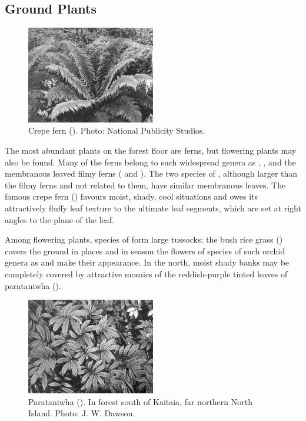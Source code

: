 \subsection{Ground Plants}

\begin{figure}
	\includegraphics[width=0.5\textwidth]{graphics/figure62crepefern.jpg}
	\centering
	\caption[Crepe fern (\emph{Leptopteris superb a}]{Crepe fern ().
	Photo: National Publicity Studios.}
	\label{fig:62crepefern}
\end{figure}

The most abundant plants on the forest floor are ferns, but flowering plants may also be found.
Many of the ferns belong to such widespread genera as , ,  and the membranous leaved filmy ferns ( and ).
The two species of , although larger than the filmy ferns and not related to them, have similar membranous leaves.
The famous crepe fern () favours moist, shady, cool situations and owes its attractively fluffy leaf texture to the ultimate leaf segments, which are set at right angles to the plane of the leaf.

Among flowering plants, species of  form large tussocks; the bush rice grass () covers the ground in places and in season the flowers of species of such orchid genera as  and  make their appearance.
In the north, moist shady banks may be completely covered by attractive mosaics of the reddish-purple tinted leaves of parataniwha ().

\begin{figure}
	\includegraphics[width=0.5\textwidth]{graphics/figure63parataniwha.jpg}
	\centering
	\caption[Parataniwha]{Parataniwha ().
In forest south of Kaitaia, far northern North Island.
	Photo: J. W. Dawson.}
	\label{fig:63parataniwha}
\end{figure}

